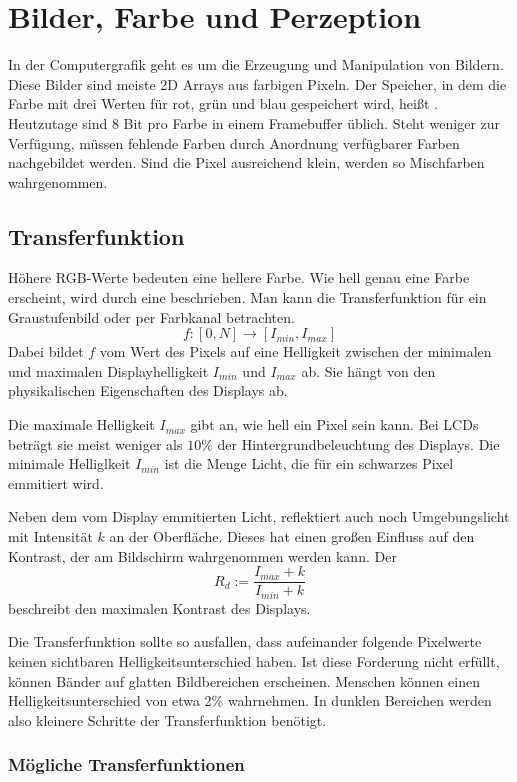 \chapter{Bilder, Farbe und Perzeption}
In der Computergrafik geht es um die Erzeugung und Manipulation von Bildern.
Diese Bilder sind meiste 2D Arrays aus farbigen Pixeln.
Der Speicher, in dem die Farbe mit drei Werten für rot, grün und blau gespeichert wird, heißt .
Heutzutage sind 8 Bit pro Farbe in einem Framebuffer üblich.
Steht weniger zur Verfügung, müssen fehlende Farben durch Anordnung verfügbarer Farben nachgebildet werden.
Sind die Pixel ausreichend klein, werden so Mischfarben wahrgenommen.

\section{Transferfunktion}
Höhere RGB-Werte bedeuten eine hellere Farbe.
Wie hell genau eine Farbe erscheint, wird durch eine  beschrieben.
Man kann die Transferfunktion für ein Graustufenbild oder per Farbkanal betrachten.
\[
	f : \left[0, N\right] \to \left[I_{min}, I_{max}\right]
\]
Dabei bildet $f$ vom Wert des Pixels auf eine Helligkeit zwischen der minimalen und maximalen Displayhelligkeit $I_{min}$ und $I_{max}$ ab.
Sie hängt von den physikalischen Eigenschaften des Displays ab.

Die maximale Helligkeit $I_{max}$ gibt an, wie hell ein Pixel sein kann.
Bei LCDs beträgt sie meist weniger als $10\%$ der Hintergrundbeleuchtung des Displays.
Die minimale Helliglkeit $I_{min}$ ist die Menge Licht, die für ein schwarzes Pixel emmitiert wird.

Neben dem vom Display emmitierten Licht, reflektiert auch noch Umgebungslicht mit Intensität $k$ an der Oberfläche.
Dieses hat einen großen Einfluss auf den Kontrast, der am Bildschirm wahrgenommen werden kann.
Der 
\[
	R_d := \frac{I_{max} + k}{I_{min} + k}
\]
beschreibt den maximalen Kontrast des Displays.

Die Transferfunktion sollte so ausfallen, dass aufeinander folgende Pixelwerte keinen sichtbaren Helligkeitsunterschied haben.
Ist diese Forderung nicht erfüllt, können Bänder auf glatten Bildbereichen erscheinen.
Menschen können einen Helligkeitsunterschied von etwa 2\% wahrnehmen.
In dunklen Bereichen werden also kleinere Schritte der Transferfunktion benötigt.

\subsection{Mögliche Transferfunktionen}
